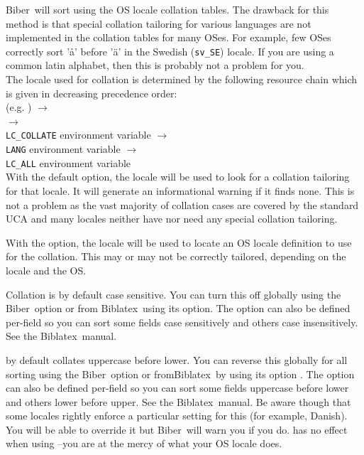 \documentclass{ltxdockit}
\newcommand*{\biber}{Biber\xspace}
\newcommand*{\biblatex}{Biblatex\xspace}
\def\biberex#1{\hbox{\hspace{-4em}\texttt{\small \detokenize{#1}}}}
\begin{document}
\biberex{--fastsort|-f}
  \noindent \biber\ will sort using
  the OS locale collation tables. The drawback for this method is that special
  collation tailoring for various languages are not implemented in the
  collation tables for many OSes. For example, few OSes correctly sort 'å'
  before 'ä' in the Swedish (\verb+sv_SE+) locale. If you are using a
  common latin alphabet, then this is probably not a problem for you.\\[2ex]

\noindent The locale used for collation is determined by the following resource
chain which is given in decreasing precedence order:\\[2ex]

\noindent{} (e.g. ) $\rightarrow$\\
\hspace*{1em} $\rightarrow$\\
\hspace*{2em}\verb+LC_COLLATE+ environment variable $\rightarrow$\\
\hspace*{3em}\verb+LANG+ environment variable $\rightarrow$\\
\hspace*{4em}\verb+LC_ALL+ environment variable\\[2ex]

\noindent With the default  option, the locale will
be used to look for a collation tailoring for that locale. It will generate an
informational warning if it finds none. This is not a problem as the vast
majority of collation cases are covered by the standard UCA and many
locales neither have nor need any special collation tailoring.

With the  option, the locale will be
used to locate an OS locale definition to use for the collation. This
may or may not be correctly tailored, depending on the locale and the OS.

Collation is by default case sensitive. You can turn this
off globally using the \biber\ option  or from
\biblatex\ using its option\linebreak[4]. The option can also
be defined per-field so you can sort some fields case sensitively and
others case insensitively. See the \biblatex\ manual.

 by default collates uppercase before lower.
You can reverse this globally for all sorting using the \biber\ option
 or from\linebreak[4]\biblatex\ by using its option
. The option can also be defined per-field so you can
sort some fields uppercase before lower and others lower before upper. See the
\biblatex\ manual. Be aware though that some locales rightly enforce a
particular setting for this (for example, Danish). You will be able to
override it but \biber\ will warn you if you do.  has
no effect when using --you are at the mercy of what
your OS locale does.
\end{document}

